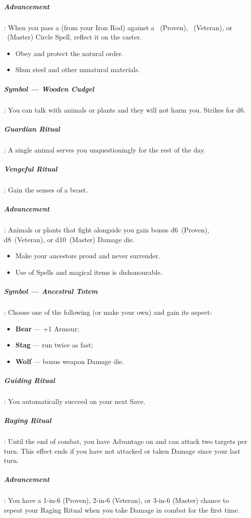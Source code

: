 \documentclass[itdr]{subfiles}
\begin{document}
\subparagraph{Advancement}: When you pass a  (from your Iron Rod) against a ~(Proven), ~(Veteran), or ~(Master) Circle Spell, reflect it on the caster.

\vfill

{\em\begin{itemize}
		\item Obey and protect the natural order.
		\item Shun steel and other unnatural materials.
\end{itemize}}

\subparagraph{Symbol --- Wooden Cudgel}: You can talk with animals or plants and they will not harm you. Strikes for d6.

\subparagraph{Guardian Ritual}: A single animal serves you unquestioningly for the rest of the day.

\subparagraph{Vengeful Ritual}: Gain the senses of a beast.

\subparagraph{Advancement}: Animals or plants that fight alongside you gain bonus d6~(Proven), d8~(Veteran), or d10~(Master) Damage die.

\vfill

{\em\begin{itemize}
		\item Make your ancestors proud and never surrender.
		\item Use of Spells and magical items is dishonourable.
\end{itemize}}

\subparagraph{Symbol --- Ancestral Totem}: Choose one of the following (or make your own) and gain its aspect:
\begin{itemize}
	\item \textbf{Bear} --- +1 Armour;
	\item \textbf{Stag} --- run twice as fast;
	\item \textbf{Wolf} --- bonus weapon Damage die.
\end{itemize}

\subparagraph{Guiding Ritual}: You automatically succeed on your next Save.

\subparagraph{Raging Ritual}: Until the end of combat, you have Advantage on  and can attack two targets per turn. This effect ends if you have not attacked or taken Damage since your last turn.

\subparagraph{Advancement}: You have a 1-in-6 (Proven), 2-in-6 (Veteran), or 3-in-6 (Master) chance to repeat your Raging Ritual when you take Damage in combat for the first time.
\end{document}
